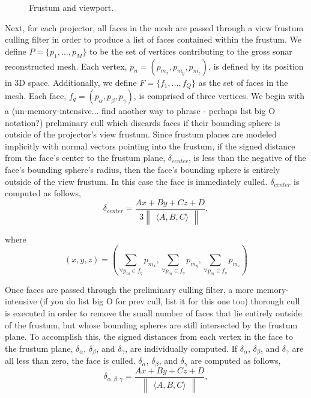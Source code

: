 \documentclass[a4paper,twoside]{article}
\begin{document}
\begin{figure}[!h]
   \vspace{-0.2cm}
   \caption{Frustum and viewport.}
  \label{fig:frustum}
 \end{figure}

Next, for each projector, all faces in the mesh are passed through a view frustum culling filter in order to produce a list of faces contained within the frustum. We define $P = \{p_{1},\dots,p_{M}\}$ to be the set of vertices contributing to the gross sonar reconstructed mesh. Each vertex, $p_{n} =  (p_{m_{x}},p_{m_{y}},p_{m_{z}})$, is defined by its position in 3D space. Additionally, we define $F = \{f_{1},\dots,f_{Q}\}$ as the set of faces in the mesh. Each face, $f_{q} = (p_{\alpha}, p_{\beta}, p_{\gamma})$, is comprised of three vertices. We begin with a (un-memory-intensive... find another way to phrase - perhaps list big O notation?) preliminary cull which discards faces if their bounding sphere is outside of the projector's view frustum. Since frustum planes are modeled implicitly with normal vectors pointing into the frustum, if the signed distance from the face's center to the frustum plane, $\delta_{center}$, is less than the negative of the face's bounding sphere's radius, then the face's bounding sphere is entirely outside of the view frustum. In this case the face is immediately culled. $\delta_{center}$ is computed as follows,
%
\begin{equation}
\delta_{center} = \frac{Ax + By + Cz + D}{3 \begin{Vmatrix} \langle A, B, C \rangle \end{Vmatrix}},
\end{equation}

where
\begin{equation}
(x, y, z) = \left(\sum\limits_{\forall p_{m} \in f_{q}} p_{m_{x}}, \sum\limits_{\forall p_{m} \in f_{q}} p_{m_{y}}, \sum\limits_{\forall p_{m} \in f_{q}} p_{m_{z}}\right)
\end{equation}

Once faces are passed through the preliminary culling filter, a more memory-intensive (if you do list big O for prev cull, list it for this one too) thorough cull is executed in order to remove the small number of faces that lie entirely outside of the frustum, but whose bounding spheres are still intersected by the frustum plane.  To accomplish this, the signed distances from each vertex in the face to the frustum plane, $\delta_{\alpha}$, $\delta_{\beta}$, and $\delta_{\gamma}$, are individually computed. If $\delta_{\alpha}$, $\delta_{\beta}$, and $\delta_{\gamma}$ are all less than zero, the face is culled. $\delta_{\alpha}$, $\delta_{\beta}$, and $\delta_{\gamma}$ are computed as follows,
%
\begin{equation} %
\delta_{\alpha, \beta, \gamma} = \frac{Ax + By + Cz + D}{\begin{Vmatrix} \langle A, B, C \rangle \end{Vmatrix}},
\end{equation}
\end{document}
